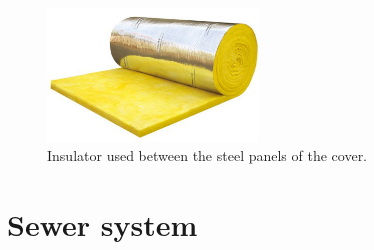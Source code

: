 \begin{figure}[H]
	\centering
	\includegraphics[clip, trim=0cm 0cm 0cm 0cm, width=0.5\textwidth]{./images/cover/glasswool}
	\caption{Insulator used between the steel panels of the cover.}
	\label{glasswool}
\end{figure}


		
	\section{Sewer system}